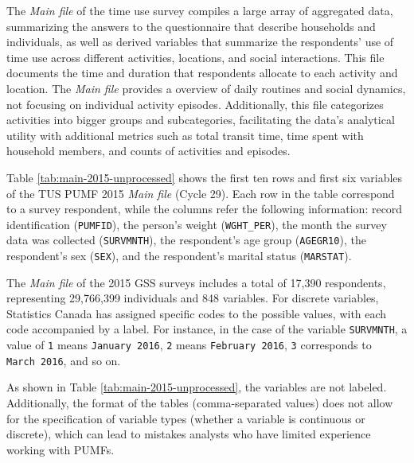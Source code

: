 \documentclass[Royal,times,sageh]{sagej}
\begin{document}
The \emph{Main file} of the time use survey compiles a large array of
aggregated data, summarizing the answers to the questionnaire that
describe households and individuals, as well as derived variables that
summarize the respondents' use of time use across different activities,
locations, and social interactions. This file documents the time and
duration that respondents allocate to each activity and location. The
\emph{Main file} provides a overview of daily routines and social
dynamics, not focusing on individual activity episodes. Additionally,
this file categorizes activities into bigger groups and subcategories,
facilitating the data's analytical utility with additional metrics such
as total transit time, time spent with household members, and counts of
activities and episodes.

Table \ref{tab:main-2015-unprocessed} shows the first ten rows and first
six variables of the TUS PUMF 2015 \emph{Main file} (Cycle 29). Each row
in the table correspond to a survey respondent, while the columns refer
the following information: record identification (\texttt{PUMFID}), the
person's weight (\texttt{WGHT\_PER}), the month the survey data was
collected (\texttt{SURVMNTH}), the respondent's age group
(\texttt{AGEGR10}), the respondent's sex (\texttt{SEX}), and the
respondent's marital status (\texttt{MARSTAT}).

The \emph{Main file} of the 2015 GSS surveys includes a total of 17,390
respondents, representing 29,766,399 individuals and 848 variables. For
discrete variables, Statistics Canada has assigned specific codes to the
possible values, with each code accompanied by a label. For instance, in
the case of the variable \texttt{SURVMNTH}, a value of \texttt{1} means
\texttt{January\ 2016}, \texttt{2} means \texttt{February\ 2016},
\texttt{3} corresponds to \texttt{March\ 2016}, and so on.

As shown in Table \ref{tab:main-2015-unprocessed}, the variables are not
labeled. Additionally, the format of the tables (comma-separated values)
does not allow for the specification of variable types (whether a
variable is continuous or discrete), which can lead to mistakes analysts
who have limited experience working with PUMFs.

\begingroup\fontsize{8}{10}\selectfont
\end{document}
